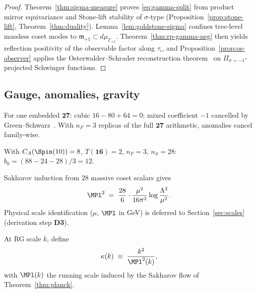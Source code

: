 \begin{proof}
Theorem~\ref{thm:sigma-measure} proves \eqref{eq:gamma-split} from product
mirror equivariance and Stone-lift stability of $\sigma$-type
(Proposition~\ref{prop:stone-lift}, Theorem~\ref{thm:duality}).
Lemma~\ref{lem:goldstone-sigma} confines tree-level massless coset modes to
$\mathfrak{m}_{+1}\subset d\mu_{\Gamma_{+1}}$. Theorem~\ref{thm:rp-gamma-neg}
then yields reflection positivity of the observable factor along $\tau_\iota$,
and Proposition~\ref{prop:os-observer} applies the Osterwalder--Schrader
reconstruction theorem~\cite{OsterwalderSchrader1973} on
$\Pi_{\sigma=-1}$-projected Schwinger functions.
\end{proof}

\subsection{Gauge, anomalies, gravity}
\label{sec:physics:gauge}

\begin{theorem}\label{thm:anomaly}
For one embedded $\mathbf{27}$: cubic $16-80+64=0$; mixed coefficient $-1$
cancelled by Green--Schwarz~\cite{GreenSchwarz1984}. With $n_F=3$ replicas of
the full $\mathbf{27}$ arithmetic, anomalies cancel family-wise.
\end{theorem}

\begin{theorem}[$b_0=12$]\label{thm:beta}
With $C_A(\Spin(10))=8$, $T(\mathbf{16})=2$, $n_F=3$, $n_S=28$:
$b_0=(88-24-28)/3=12$.
\end{theorem}

\begin{theorem}\label{thm:planck}
Sakharov induction from $28$ massive coset scalars gives
\begin{equation}\label{eq:planck}
  \MPl^2
  \;=\;
  \frac{28}{6}\cdot\frac{\mu^2}{16\pi^2}
  \log\frac{\Lambda^2}{\mu^2}.
\end{equation}
Physical scale identification ($\mu$, $\MPl$ in GeV) is deferred to
Section~\ref{sec:scales} (derivation step \textbf{D3}).
\end{theorem}

\begin{definition}\label{def:kappa}
At RG scale $k$, define
\begin{equation}\label{eq:kappa-def}
  \kappa(k)\;\equiv\;\frac{k^2}{\MPl^2(k)},
\end{equation}
with $\MPl(k)$ the running scale induced by the Sakharov flow of
Theorem~\ref{thm:planck}.
\end{definition}

